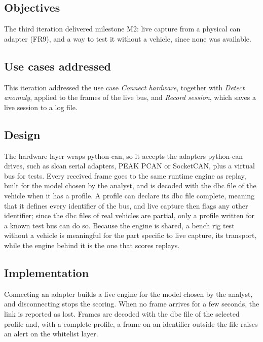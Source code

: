 \subsection{Objectives}

The third iteration delivered milestone M2: live capture from a physical \gls{can} adapter (FR9), and a way to test it without a vehicle, since none was available.

\subsection{Use cases addressed}

This iteration addressed the use case \emph{Connect hardware}, together with \emph{Detect anomaly}, applied to the frames of the live bus, and \emph{Record session}, which saves a live session to a log file.

\subsection{Design}
\label{sec:design-hardware}

The hardware layer wraps python-can, so it accepts the adapters python-can drives, such as slcan serial adapters, PEAK PCAN or SocketCAN, plus a virtual bus for tests. Every received frame goes to the same runtime engine as replay, built for the model chosen by the analyst, and is decoded with the \gls{dbc} file of the vehicle when it has a profile. A profile can declare its \gls{dbc} file complete, meaning that it defines every identifier of the bus, and live capture then flags any other identifier; since the \gls{dbc} files of real vehicles are partial, only a profile written for a known test bus can do so. Because the engine is shared, a bench rig test without a vehicle is meaningful for the part specific to live capture, its transport, while the engine behind it is the one that scores replays.

\subsection{Implementation}
\label{sec:impl-hardware}

Connecting an adapter builds a live engine for the model chosen by the analyst, and disconnecting stops the scoring. When no frame arrives for a few seconds, the link is reported as lost. Frames are decoded with the \gls{dbc} file of the selected profile and, with a complete profile, a frame on an identifier outside the file raises an alert on the whitelist layer.

